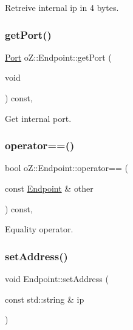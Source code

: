 Retreive internal ip in 4 bytes. 

\mbox{\label{classo_z_1_1_endpoint_aad983948594b295187d6117f99b1988d}} 
\subsubsection{\texorpdfstring{getPort()}{getPort()}}
{\footnotesize\ttfamily \mbox{\hyperlink{namespaceo_z_afeccb82d451972ba3b7d2a32b066b30b}{Port}} o\+Z\+::\+Endpoint\+::get\+Port (\begin{DoxyParamCaption}\item[{void}]{ }\end{DoxyParamCaption}) const\hspace{0.3cm}{\ttfamily [inline]}, {\ttfamily [noexcept]}}



Get internal port. 

\mbox{\label{classo_z_1_1_endpoint_ab5a405bf455ab2f4e28458b0ba69d399}} 
\subsubsection{\texorpdfstring{operator==()}{operator==()}}
{\footnotesize\ttfamily bool o\+Z\+::\+Endpoint\+::operator== (\begin{DoxyParamCaption}\item[{const \mbox{\hyperlink{classo_z_1_1_endpoint}{Endpoint}} \&}]{other }\end{DoxyParamCaption}) const\hspace{0.3cm}{\ttfamily [inline]}, {\ttfamily [noexcept]}}



Equality operator. 

\mbox{\label{classo_z_1_1_endpoint_a90caf5f6497ec5a09b34d7a6069502da}} 
\subsubsection{\texorpdfstring{setAddress()}{setAddress()}\hspace{0.1cm}{\footnotesize\ttfamily [1/2]}}
{\footnotesize\ttfamily void Endpoint\+::set\+Address (\begin{DoxyParamCaption}\item[{const std\+::string \&}]{ip }\end{DoxyParamCaption})}



